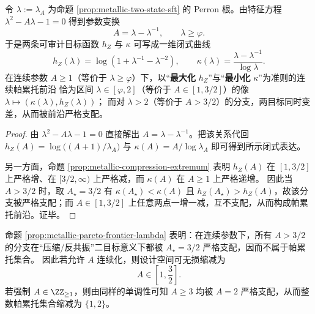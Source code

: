 \begin{proposition}\label{prop:metallic-pareto-frontier-lambda}
令 \(\lambda:=\lambda_A\) 为命题 \ref{prop:metallic-two-state-sft} 的 Perron 根。由特征方程
\(\lambda^2-A\lambda-1=0\) 得到参数变换
\[
A=\lambda-\lambda^{-1},\qquad \lambda\ge \varphi.
\]
于是两条可审计目标函数 \(h_Z\) 与 \(\kappa\) 可写成一维闭式曲线
\[
h_Z(\lambda)=\log\!\left(1+\lambda^{-1}-\lambda^{-2}\right),
\qquad
\kappa(\lambda)=\frac{\lambda-\lambda^{-1}}{\log\lambda}.
\]
在连续参数 \(A\ge 1\)（等价于 \(\lambda\ge\varphi\)）下，以“\textbf{最大化} \(h_Z\)”与“\textbf{最小化} \(\kappa\)”为准则的连续帕累托前沿
恰为区间 \(\lambda\in[\varphi,2]\)（等价于 \(A\in[1,3/2]\)）的像 \(\lambda\mapsto(\kappa(\lambda),h_Z(\lambda))\)；
而对 \(\lambda>2\)（等价于 \(A>3/2\)）的分支，两目标同时变差，从而被前沿严格支配。
\end{proposition}
\begin{proof}
由 \(\lambda^2-A\lambda-1=0\) 直接解出 \(A=\lambda-\lambda^{-1}\)。把该关系代回
\(
h_Z(A)=\log\bigl((A+1)/\lambda_A\bigr)
\)
与
\(
\kappa(A)=A/\log\lambda_A
\)
即可得到所示闭式表达。
\par
另一方面，命题 \ref{prop:metallic-compression-extremum} 表明 \(h_Z(A)\) 在 \([1,3/2]\) 上严格增、在 \([3/2,\infty)\) 上严格减，而 \(\kappa(A)\) 在 \(A\ge 1\) 上严格递增。
因此当 \(A>3/2\) 时，取 \(A_\star=3/2\) 有 \(\kappa(A_\star)<\kappa(A)\) 且 \(h_Z(A_\star)>h_Z(A)\)，故该分支被严格支配；而 \(A\in[1,3/2]\) 上任意两点一增一减，互不支配，从而构成帕累托前沿。证毕。
\end{proof}

\begin{remark}\label{rem:metallic-design-space-reduction}
命题 \ref{prop:metallic-pareto-frontier-lambda} 表明：在连续参数下，所有 \(A>3/2\) 的分支在“压缩/反共振”二目标意义下都被 \(A_\star=3/2\) 严格支配，因而不属于帕累托集合。
因此若允许 \(A\) 连续化，则设计空间可无损缩减为
\[
A\in\left[1,\frac{3}{2}\right].
\]
若强制 \(A\in\ZZ_{\ge 1}\)，则由同样的单调性可知 \(A\ge 3\) 均被 \(A=2\) 严格支配，从而整数帕累托集合缩减为 \(\{1,2\}\)。
\end{remark}

